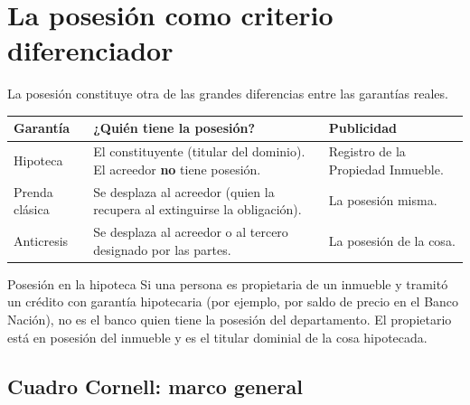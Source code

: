 \documentclass[12pt,oneside]{book}
\begin{document}
\section{La posesión como criterio diferenciador}

La posesión constituye otra de las grandes diferencias entre las garantías reales.

\begin{table}[H]
\centering
\begin{tabularx}{\textwidth}{
    >{\raggedright\arraybackslash}p{}
    >{\raggedright\arraybackslash}X
    >{\raggedright\arraybackslash}p{}
}
\toprule
\textbf{Garantía} & \textbf{¿Quién tiene la posesión?} & \textbf{Publicidad} \\
\midrule
Hipoteca & El constituyente (titular del dominio). El acreedor \textbf{no} tiene posesión. & Registro de la Propiedad Inmueble. \\
Prenda clásica & Se desplaza al acreedor (quien la recupera al extinguirse la obligación). & La posesión misma. \\
Anticresis & Se desplaza al acreedor o al tercero designado por las partes. & La posesión de la cosa. \\
\bottomrule
\end{tabularx}
\end{table}

\begin{example}{Posesión en la hipoteca}
Si una persona es propietaria de un inmueble y tramitó un crédito con garantía hipotecaria (por ejemplo, por saldo de precio en el Banco Nación), no es el banco quien tiene la posesión del departamento. El propietario está en posesión del inmueble y es el titular dominial de la cosa hipotecada.
\end{example}

\subsection*{Cuadro Cornell: marco general}
\end{document}
